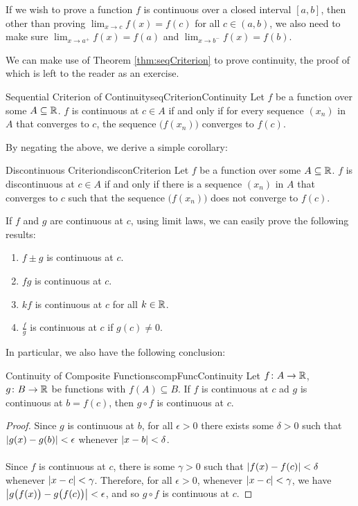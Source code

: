 \documentclass[math]{amznotes}
\theoremstyle{remark}
\begin{document}
If we wish to prove a function $f$ is continuous over a closed interval $[a, b]$, then other than proving $\lim_{x \to c}f(x) = f(c)$ for all $c \in (a, b)$, we also need to make sure $\lim_{x \to a^+}f(x) = f(a)$ and $\lim_{x \to b^-}f(x) = f(b)$.

We can make use of Theorem \ref{thm:seqCriterion} to prove continuity, the proof of which is left to the reader as an exercise.
\begin{thmbox}{Sequential Criterion of Continuity}{seqCriterionContinuity}
    Let $f$ be a function over some $A \subseteq \mathbb{R}$. $f$ is continuous at $c \in A$ if and only if for every sequence $(x_n)$ in $A$ that converges to $c$, the sequence $\bigl(f(x_n)\bigr)$ converges to $f(c)$.
\end{thmbox}
By negating the above, we derive a simple corollary:
\begin{corbox}{Discontinuous Criterion}{disconCriterion}
    Let $f$ be a function over some $A \subseteq \mathbb{R}$. $f$ is discontinuous at $c \in A$ if and only if there is a sequence $(x_n)$ in $A$ that converges to $c$ such that the sequence $\bigl(f(x_n)\bigr)$ does not converge to $f(c)$.
\end{corbox}
If $f$ and $g$ are continuous at $c$, using limit laws, we can easily prove the following results:
\begin{enumerate}
    \item $f \pm g$ is continuous at $c$.
    \item $fg$ is continuous at $c$.
    \item $kf$ is continuous at $c$ for all $k \in \mathbb{R}$.
    \item $\frac{f}{g}$ is continuous at $c$ if $g(c) \neq 0$.
\end{enumerate}
In particular, we also have the following conclusion:
\begin{thmbox}{Continuity of Composite Functions}{compFuncContinuity}
    Let $f \colon A \to \mathbb{R}$, $g \colon B \to \mathbb{R}$ be functions with $f(A) \subseteq B$. If $f$ is continuous at $c$ ad $g$ is continuous at $b = f(c)$, then $g \circ f$ is continuous at $c$.
    \tcblower
    \begin{proof}
        Since $g$ is continuous at $b$, for all $\epsilon > 0$ there exists some $\delta > 0$ such that ${\left\lvert {g(x) - g(b)} \right\rvert} < \epsilon$ whenever ${\left\lvert {x - b} \right\rvert} < \delta$.
        \\\\
        Since $f$ is continuous at $c$, there is some $\gamma > 0$ such that ${\left\lvert {f(x) - f(c)} \right\rvert} < \delta$ whenever ${\left\lvert {x - c} \right\rvert} < \gamma$. Therefore, for all $\epsilon > 0$, whenever ${\left\lvert {x - c} \right\rvert} < \gamma$, we have ${\left\lvert {g\bigl(f(x)\bigr) - g\bigl(f(c)\bigr)} \right\rvert} < \epsilon$, and so $g \circ f$ is continuous at $c$.
    \end{proof}
\end{thmbox}
\end{document}
